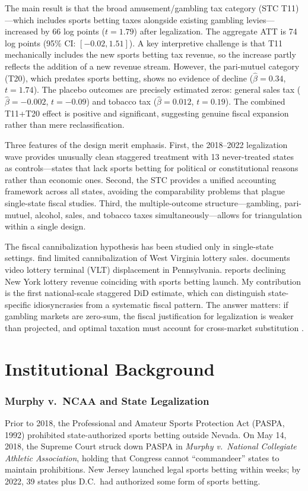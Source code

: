 \documentclass[12pt]{article}
\begin{document}
The main result is that the broad amusement/gambling tax category (STC T11)---which includes sports betting taxes alongside existing gambling levies---increased by 66 log points ($t = 1.79$) after legalization. The \citet{callaway2021difference} aggregate ATT is 74 log points (95\% CI: $[-0.02, 1.51]$). A key interpretive challenge is that T11 mechanically includes the new sports betting tax revenue, so the increase partly reflects the addition of a new revenue stream. However, the pari-mutuel category (T20), which predates sports betting, shows no evidence of decline ($\hat{\beta} = 0.34$, $t = 1.74$). The placebo outcomes are precisely estimated zeros: general sales tax ($\hat{\beta} = -0.002$, $t = -0.09$) and tobacco tax ($\hat{\beta} = 0.012$, $t = 0.19$). The combined T11+T20 effect is positive and significant, suggesting genuine fiscal expansion rather than mere reclassification.

Three features of the design merit emphasis. First, the 2018--2022 legalization wave provides unusually clean staggered treatment with 13 never-treated states as controls---states that lack sports betting for political or constitutional reasons rather than economic ones. Second, the STC provides a unified accounting framework across all states, avoiding the comparability problems that plague single-state fiscal studies. Third, the multiple-outcome structure---gambling, pari-mutuel, alcohol, sales, and tobacco taxes simultaneously---allows for triangulation within a single design.

The fiscal cannibalization hypothesis has been studied only in single-state settings. \citet{humphreys2021wv} find limited cannibalization of West Virginia lottery sales. \citet{coughlin2024pa} documents video lottery terminal (VLT) displacement in Pennsylvania. \citet{matheson2025ny} reports declining New York lottery revenue coinciding with sports betting launch. My contribution is the first national-scale staggered DiD estimate, which can distinguish state-specific idiosyncrasies from a systematic fiscal pattern. The answer matters: if gambling markets are zero-sum, the fiscal justification for legalization is weaker than projected, and optimal taxation must account for cross-market substitution \citep{allcott2019regressive}.

\section{Institutional Background}

\subsubsection*{Murphy v.\ NCAA and State Legalization} Prior to 2018, the Professional and Amateur Sports Protection Act (PASPA, 1992) prohibited state-authorized sports betting outside Nevada. On May 14, 2018, the Supreme Court struck down PASPA in \textit{Murphy v.\ National Collegiate Athletic Association}, holding that Congress cannot ``commandeer'' states to maintain prohibitions. New Jersey launched legal sports betting within weeks; by 2022, 39 states plus D.C.\ had authorized some form of sports betting.
\end{document}
